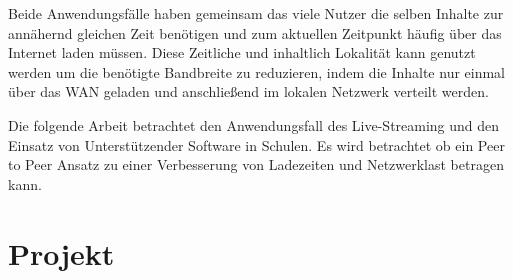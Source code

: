Beide Anwendungsfälle haben gemeinsam das viele Nutzer die selben Inhalte zur annähernd gleichen Zeit benötigen und zum aktuellen Zeitpunkt häufig über das Internet laden müssen. Diese Zeitliche und inhaltlich Lokalität kann genutzt werden um die benötigte Bandbreite zu reduzieren, indem die Inhalte nur einmal über das WAN geladen und anschließend im lokalen Netzwerk verteilt werden.

Die folgende Arbeit betrachtet den Anwendungsfall des Live-Streaming und den Einsatz von Unterstützender Software in Schulen. Es wird betrachtet ob ein Peer to Peer Ansatz zu einer Verbesserung von Ladezeiten und Netzwerklast betragen kann.
 




\section{Projekt \schulCloud}

